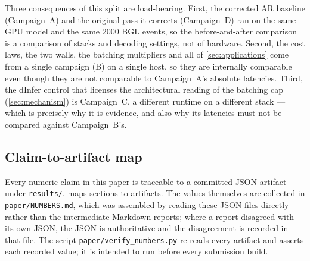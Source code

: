 Three consequences of this split are load-bearing. First, the corrected AR
baseline (Campaign~A) and the original pass it corrects (Campaign~D) ran on the
same GPU model and the same 2000 BGL events, so the before-and-after comparison
is a comparison of stacks and decoding settings, not of hardware. Second, the
cost laws, the two walls, the batching multipliers and all of
\cref{sec:applications} come from a single campaign (B) on a single host, so
they are internally comparable even though they are not comparable to
Campaign~A's absolute latencies. Third, the dInfer control that licenses the
architectural reading of the batching cap (\cref{sec:mechanism}) is Campaign~C,
a different runtime on a different stack --- which is precisely why it is
evidence, and also why its latencies must not be compared against Campaign~B's.

\subsection{Claim-to-artifact map}

Every numeric claim in this paper is traceable to a committed JSON artifact
under \texttt{results/}.  maps sections to artifacts. The
values themselves are collected in \texttt{paper/NUMBERS.md}, which was
assembled by reading these JSON files directly rather than the intermediate
Markdown reports; where a report disagreed with its own JSON, the JSON is
authoritative and the disagreement is recorded in that file. The script
\texttt{paper/verify\_numbers.py} re-reads every artifact and asserts each
recorded value; it is intended to run before every submission build.

